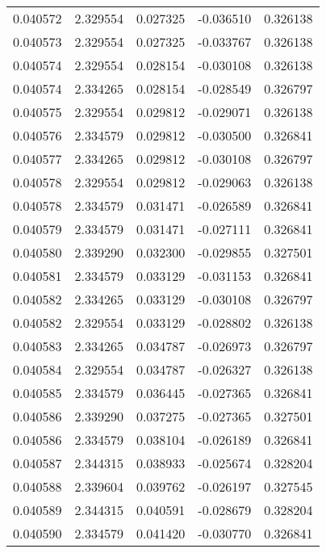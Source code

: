 \begin{tabular}{lrrrr}
0.040572    &  2.329554 &  0.027325 & -0.036510 &             0.326138 \\
0.040573    &  2.329554 &  0.027325 & -0.033767 &             0.326138 \\
0.040574    &  2.329554 &  0.028154 & -0.030108 &             0.326138 \\
0.040574    &  2.334265 &  0.028154 & -0.028549 &             0.326797 \\
0.040575    &  2.329554 &  0.029812 & -0.029071 &             0.326138 \\
0.040576    &  2.334579 &  0.029812 & -0.030500 &             0.326841 \\
0.040577    &  2.334265 &  0.029812 & -0.030108 &             0.326797 \\
0.040578    &  2.329554 &  0.029812 & -0.029063 &             0.326138 \\
0.040578    &  2.334579 &  0.031471 & -0.026589 &             0.326841 \\
0.040579    &  2.334579 &  0.031471 & -0.027111 &             0.326841 \\
0.040580    &  2.339290 &  0.032300 & -0.029855 &             0.327501 \\
0.040581    &  2.334579 &  0.033129 & -0.031153 &             0.326841 \\
0.040582    &  2.334265 &  0.033129 & -0.030108 &             0.326797 \\
0.040582    &  2.329554 &  0.033129 & -0.028802 &             0.326138 \\
0.040583    &  2.334265 &  0.034787 & -0.026973 &             0.326797 \\
0.040584    &  2.329554 &  0.034787 & -0.026327 &             0.326138 \\
0.040585    &  2.334579 &  0.036445 & -0.027365 &             0.326841 \\
0.040586    &  2.339290 &  0.037275 & -0.027365 &             0.327501 \\
0.040586    &  2.334579 &  0.038104 & -0.026189 &             0.326841 \\
0.040587    &  2.344315 &  0.038933 & -0.025674 &             0.328204 \\
0.040588    &  2.339604 &  0.039762 & -0.026197 &             0.327545 \\
0.040589    &  2.344315 &  0.040591 & -0.028679 &             0.328204 \\
0.040590    &  2.334579 &  0.041420 & -0.030770 &             0.326841 \\

\end{tabular}
